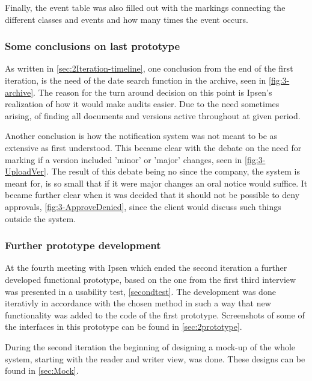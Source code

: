 Finally, the event table was also filled out with the markings connecting the different classes and events and how many times the event occurs.

\subsubsection*{Some conclusions on last prototype}
As written in \cref{sec:2Iteration-timeline}, one conclusion from the end of the first iteration, is the need of the date search function in the archive, seen in \cref{fig:3-archive}.
The reason for the turn around decision on this point is Ipsen's realization of how it would make audits easier.
Due to the need sometimes arising, of finding all documents and versions active throughout at given period.

Another conclusion is how the notification system was not meant to be as extensive as first understood. 
This became clear with the debate on the need for marking if a version included 'minor' or 'major' changes, seen in \cref{fig:3-UploadVer}.
The result of this debate being no since the company, the system is meant for, is so small that if it were major changes an oral notice would suffice.
It became further clear when it was decided that it should not be possible to deny approvals, \cref{fig:3-ApproveDenied}, since the client would discuss such things outside the system.

\subsubsection*{Further prototype development}
At the fourth meeting with Ipsen which ended the second iteration a further developed functional prototype, based on the one from the first third interview was presented in a usability test, \cref{secondtest}.
The development was done iterativly in accordance with the chosen method in such a way that new functionality was added to the code of the first prototype.
Screenshots of some of the interfaces in this prototype can be found in \cref{sec:2prototype}.

During the second iteration the beginning of designing a mock-up of the whole system, starting with the reader and writer view, was done. 
These designs can be found in \cref{sec:Mock}.